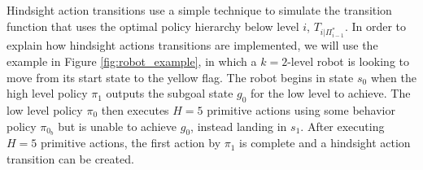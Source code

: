 \documentclass{article} %
\begin{document}

Hindsight action transitions use a simple technique to simulate the transition function that uses the optimal policy hierarchy below level $i$, $T_{i|\Pi_{i-1}^*}$.  In order to explain how hindsight actions transitions are implemented, we will use the example in Figure \ref{fig:robot_example}, in which a $k=2$-level robot is looking to move from its start state to the yellow flag. The robot begins in state $s_0$ when the high level policy $\pi_1$ outputs the subgoal state $g_0$ for the low level to achieve.  The low level policy $\pi_0$ then executes $H=5$ primitive actions using some behavior policy $\pi_{0_b}$ but is unable to achieve $g_0$, instead landing in $s_1$.  After executing $H=5$ primitive actions, the first action by $\pi_1$ is complete and a hindsight action transition can be created. 
\end{document}
